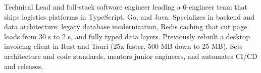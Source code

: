 

\begin{cvparagraph}

  Technical Lead and full-stack software engineer leading a 6-engineer team that ships logistics platforms in TypeScript, Go, and Java. Specializes in backend and data architecture: legacy database modernization, Redis caching that cut page loads from 30 s to 2 s, and fully typed data layers. Previously rebuilt a desktop invoicing client in Rust and Tauri (25x faster, 500 MB down to 25 MB). Sets architecture and code standards, mentors junior engineers, and automates CI/CD and releases.
\end{cvparagraph}
